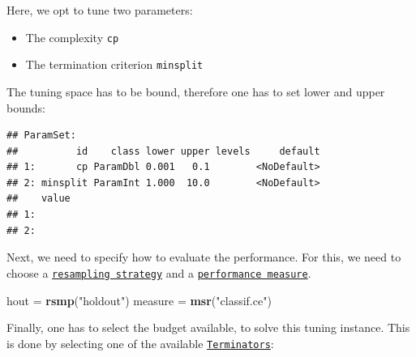 \documentclass[]{article}
\newenvironment{Shaded}{\begin{snugshade}}{\end{snugshade}}
\newcommand{\DataTypeTok}[1]{\textcolor[rgb]{0.13,0.29,0.53}{#1}}
\newcommand{\DecValTok}[1]{\textcolor[rgb]{0.00,0.00,0.81}{#1}}
\newcommand{\FloatTok}[1]{\textcolor[rgb]{0.00,0.00,0.81}{#1}}
\newcommand{\KeywordTok}[1]{\textcolor[rgb]{0.13,0.29,0.53}{\textbf{#1}}}
\newcommand{\NormalTok}[1]{#1}
\newcommand{\OperatorTok}[1]{\textcolor[rgb]{0.81,0.36,0.00}{\textbf{#1}}}
\newcommand{\StringTok}[1]{\textcolor[rgb]{0.31,0.60,0.02}{#1}}
\providecommand{\tightlist}{%
  \setlength{\itemsep}{0pt}\setlength{\parskip}{0pt}}
\renewenvironment{Shaded} {\begin{snugshade}\small} {\end{snugshade}}
\begin{document}
Here, we opt to tune two parameters:

\begin{itemize}
\tightlist
\item
  The complexity \texttt{cp}
\item
  The termination criterion \texttt{minsplit}
\end{itemize}

The tuning space has to be bound, therefore one has to set lower and upper bounds:

\begin{Shaded}
\end{Shaded}

\begin{verbatim}
## ParamSet: 
##          id    class lower upper levels     default
## 1:       cp ParamDbl 0.001   0.1        <NoDefault>
## 2: minsplit ParamInt 1.000  10.0        <NoDefault>
##    value
## 1:      
## 2:
\end{verbatim}

Next, we need to specify how to evaluate the performance.
For this, we need to choose a \href{https://mlr3.mlr-org.com/reference/Resampling.html}{\texttt{resampling\ strategy}} and a \href{https://mlr3.mlr-org.com/reference/Measure.html}{\texttt{performance\ measure}}.

\begin{Shaded}
\begin{Highlighting}[]
\NormalTok{hout =}\StringTok{ }\KeywordTok{rsmp}\NormalTok{(}\StringTok{"holdout"}\NormalTok{)}
\NormalTok{measure =}\StringTok{ }\KeywordTok{msr}\NormalTok{(}\StringTok{"classif.ce"}\NormalTok{)}
\end{Highlighting}
\end{Shaded}

Finally, one has to select the budget available, to solve this tuning instance.
This is done by selecting one of the available \href{https://mlr3tuning.mlr-org.com/reference/Terminator.html}{\texttt{Terminators}}:
\end{document}
